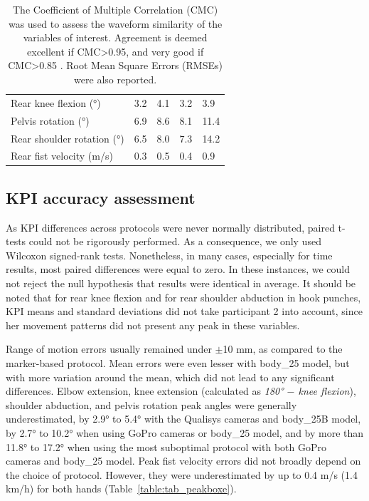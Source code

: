 \begin{table}[!ht]
{\begin{tabular}{lllll}
          \cmidrule(l{2pt}r{2pt}){2-5}
          Rear knee flexion (°) & 3.2 & 4.1 & 3.2 & 3.9\\
          Pelvis rotation (°) & 6.9 & 8.6 & 8.1 & 11.4\\
          Rear shoulder rotation (°) & 6.5 & 8.0 & 7.3 & 14.2 \\
          Rear fist velocity (m/s) & 0.3 & 0.5 & 0.4 & 0.9\\
          \bottomrule
      \end{tabular}}
      \caption{The Coefficient of Multiple Correlation (CMC) was used to assess the waveform similarity of the variables of interest. Agreement is deemed excellent if CMC>0.95, and very good if CMC>0.85 \cite{Ferrari2010}. Root Mean Square Errors (RMSEs) were also reported.}
      \label{table:tab_cmcboxe}
\end{table}


\subsection{KPI accuracy assessment}

As KPI differences across protocols were never normally distributed, paired t-tests could not be rigorously performed. As a consequence, we only used Wilcoxon signed-rank tests. Nonetheless, in many cases, especially for time results, most paired differences were equal to zero. In these instances, we could not reject the null hypothesis that results were identical in average. It should be noted that for rear knee flexion and for rear shoulder abduction in hook punches, KPI means and standard deviations did not take participant 2 into account, since her movement patterns did not present any peak in these variables.

Range of motion errors usually remained under $\pm$10 mm, as compared to the marker-based protocol. Mean errors were even lesser with body\_25 model, but with more variation around the mean, which did not lead to any significant differences. Elbow extension, knee extension (calculated as \textit{180° $-$ knee flexion}), shoulder abduction, and pelvis rotation peak angles were generally underestimated, by 2.9° to 5.4° with the Qualisys cameras and body\_25B model, by 2.7° to 10.2° when using GoPro cameras or body\_25 model, and by more than 11.8° to 17.2° when using the most suboptimal protocol with both GoPro cameras and body\_25 model. Peak fist velocity errors did not broadly depend on the choice of protocol. However, they were underestimated by up to 0.4 m/s (1.4 km/h) for both hands (Table~\ref{table:tab_peakboxe}).

